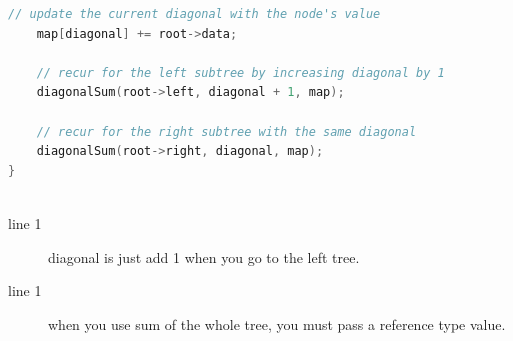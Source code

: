 \documentclass[a4paper,11pt,twoside]{book}
\begin{document}
\begin{itemize}
\begin{lstlisting}[frame=single, language=c++]
	// update the current diagonal with the node's value
	map[diagonal] += root->data;
	
	// recur for the left subtree by increasing diagonal by 1
	diagonalSum(root->left, diagonal + 1, map);
	
	// recur for the right subtree with the same diagonal
	diagonalSum(root->right, diagonal, map);
}
	
\end{lstlisting}
\begin{description}
	\item[line 1] diagonal is just add 1 when you go to the left tree.
	\item[line 1] when you use sum of the whole tree, you must pass a reference type value. 
\end{description}	

\end{itemize}

 
\end{document}
